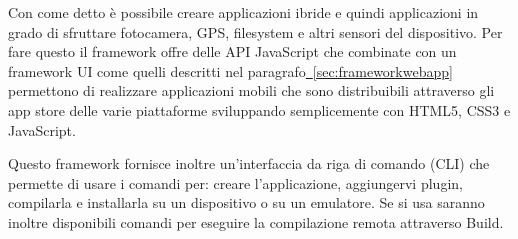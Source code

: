             Con \pg{} come detto è possibile creare applicazioni ibride e quindi
            applicazioni in grado di sfruttare fotocamera, GPS, filesys\-tem e
            altri sensori del dispositivo. Per fare questo il frame\-work offre
            delle API JavaScript che combinate con un frame\-work UI come quelli descritti
            nel paragrafo\hyperref[sec:frameworkwebapp]{~\ref{sec:frameworkwebapp}}
            permettono di realizzare applicazioni mobili che sono distribuibili
            attraverso gli app store delle varie piattaforme sviluppando
            semplicemente con HTML5, CSS3 e JavaScript.

            Questo frame\-work fornisce inoltre un'interfaccia da riga di comando (CLI)
            che permette di usare i comandi per: creare l'applicazione, aggiungervi
            plugin, compilarla e installarla su un dispositivo o su un emulatore.
            Se si usa \pg{} saranno inoltre disponibili comandi per eseguire
            la compilazione remota attraverso \pg{} Build.

